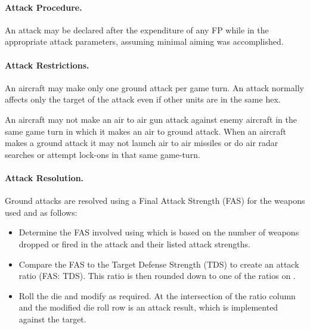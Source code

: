 \paragraph{Attack Procedure.} An attack may be declared after the expenditure of any FP while in the appropriate attack parameters, assuming minimal aiming was accomplished.

\paragraph{Attack Restrictions.} An aircraft may make only one ground attack per game turn. An attack normally affects only the target of the attack even if other units are in the same hex.

An aircraft may not make an air to air gun attack against enemy aircraft in the same game turn in which it makes an air to ground attack. When an aircraft makes a ground attack it may not launch air to air missiles or do air radar searches or attempt lock-ons in that same game-turn.

\paragraph{Attack Resolution.} 



Ground attacks are resolved using a Final Attack Strength (FAS) for the weapons used and  as follows:
\begin{itemize}
\item Determine the FAS involved using  which is based on the number of weapons dropped or fired in the attack and their listed attack strengths.
\item Compare the FAS to the Target Defense Strength (TDS) to create an attack ratio (FAS: TDS). This ratio is then rounded down to one of the ratios on .
\item Roll the die and modify as required. At the intersection of the ratio column and the modified die roll row is an attack result, which is implemented against the target.
\end{itemize}

